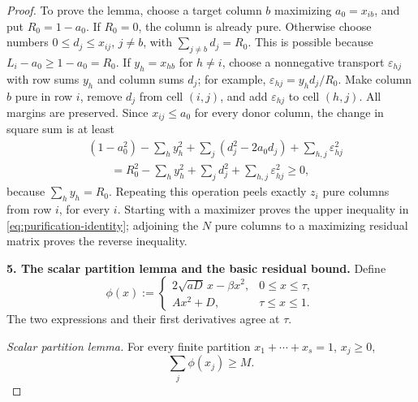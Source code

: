 \documentclass[11pt]{article}
\theoremstyle{remark}
\begin{document}
\begin{proof}
To prove the lemma, choose a target column $b$ maximizing
$a_0=x_{ib}$, and put $R_0=1-a_0$.  If $R_0=0$, the column is
already pure.  Otherwise choose numbers
$0\leq d_j\leq x_{ij}$, $j\neq b$, with
$\sum_{j\neq b}d_j=R_0$.  This is possible because
$L_i-a_0\geq1-a_0=R_0$.  If $y_h=x_{hb}$ for $h\neq i$, choose a
nonnegative transport $\varepsilon_{hj}$ with row sums $y_h$ and
column sums $d_j$; for example,
$\varepsilon_{hj}=y_hd_j/R_0$.  Make column $b$ pure in row $i$,
remove $d_j$ from cell $(i,j)$, and add
$\varepsilon_{hj}$ to cell $(h,j)$.  All margins are preserved.
Since $x_{ij}\leq a_0$ for every donor column, the change in square sum
is at least
\begin{align*}
 &(1-a_0^2)-\sum_hy_h^2
 +\sum_j(d_j^2-2a_0d_j)+\sum_{h,j}\varepsilon_{hj}^2\\
 &\qquad=R_0^2-\sum_hy_h^2+\sum_jd_j^2
              +\sum_{h,j}\varepsilon_{hj}^2\geq0,
\end{align*}
because $\sum_hy_h=R_0$.  Repeating this operation peels exactly
$z_i$ pure columns from row $i$, for every $i$.  Starting with a
maximizer proves the upper inequality in
\eqref{eq:purification-identity}; adjoining the $N$ pure columns to a
maximizing residual matrix proves the reverse inequality.

\medskip
\noindent
\textbf{5. The scalar partition lemma and the basic residual bound.}
Define
\begin{equation}\label{eq:phi-def}
 \phi(x):=
 \begin{cases}
 2\sqrt{aD}\,x-\beta x^2,&0\leq x\leq\tau,\\
 Ax^2+D,&\tau\leq x\leq1.
 \end{cases}
\end{equation}
The two expressions and their first derivatives agree at $\tau$.

\smallskip
\noindent
\emph{Scalar partition lemma.}
For every finite partition $x_1+\cdots+x_s=1$, $x_j\geq0$,
\begin{equation}\label{eq:scalar-partition}
 \sum_j\phi(x_j)\geq M.
\end{equation}


\end{proof}
\end{document}
